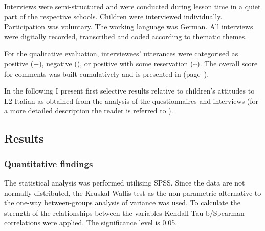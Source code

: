 \documentclass[output=paper]{../langscibook}
\begin{document}


Interviews were semi-structured and were conducted during lesson time in a quiet part of the respective schools. Children were interviewed individually. Participation was voluntary. The working language was German. All interviews were digitally recorded, transcribed and coded according to thematic themes. 

For the qualitative evaluation, interviewees’ utterances were categorised as positive (+), negative (\textminus), or positive with some reservation ({\textasciitilde}). The overall score for comments was built cumulatively and is presented in  (page~\pageref{tab:7:5}). 

In the following I present first selective results relative to children’s attitudes to L2 Italian as obtained from the analysis of the questionnaires and interviews (for a more detailed description the reader is referred to \citealt{HoferForthc}).


\subsection{Results}
\subsubsection{Quantitative findings}


The statistical analysis was performed utilising SPSS. Since the data are not normally distributed, the Kruskal-Wallis test as the non-parametric alternative to the one-way between-groups analysis of variance was used. To calculate the strength of the relationships between the variables Kendall-Tau-b\slash Spearman correlations were applied. The significance level is 0.05.
\end{document}
